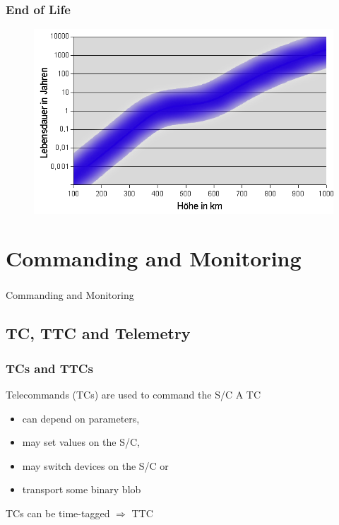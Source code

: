 \documentclass[12pt,utf8,notheorems,compress]{beamer}
\begin{document}
\begin{frame}
  \frametitle{End of Life}
  \pause
  \begin{figure}[!ht]
    \centering
    \includegraphics[width=\textwidth]{lifetime.png}
  \end{figure}
\end{frame}

\section{Commanding and Monitoring}

\begin{frame}
  \frametitle{}
  \vfill
  \begin{center}
    \Large Commanding and Monitoring
  \end{center}
  \vfill
\end{frame}

\subsection{TC, TTC and Telemetry}

\begin{frame}
  \frametitle{TCs and TTCs}
  \pause
  \vfill
  Telecommands (TCs) are used to command the S/C \pause
  \vfill
  A TC \pause
  \begin{itemize}
  \item can depend on parameters, \pause
  \item may set values on the S/C, \pause
  \item may switch devices on the S/C or \pause
  \item transport some binary blob \pause
  \end{itemize}
  \vfill
  TCs can be time-tagged $\Longrightarrow$ TTC
  \vfill
\end{frame}
\end{document}
